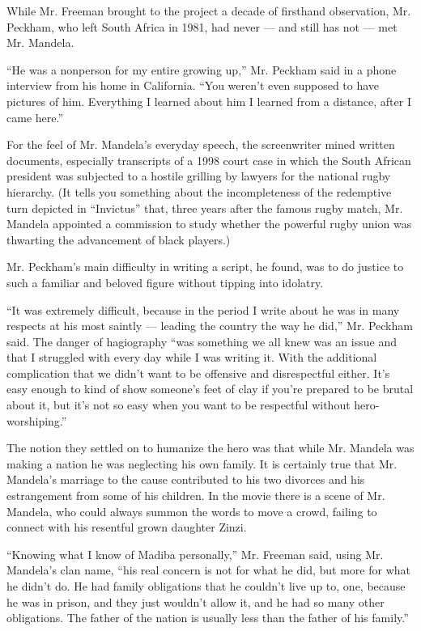 While Mr. Freeman brought to the project a decade of firsthand
observation, Mr. Peckham, who left South Africa in 1981, had never ---
and still has not --- met Mr. Mandela.

``He was a nonperson for my entire growing up,'' Mr. Peckham said in a
phone interview from his home in California. ``You weren't even supposed
to have pictures of him. Everything I learned about him I learned from a
distance, after I came here.''

For the feel of Mr. Mandela's everyday speech, the screenwriter mined
written documents, especially transcripts of a 1998 court case in which
the South African president was subjected to a hostile grilling by
lawyers for the national rugby hierarchy. (It tells you something about
the incompleteness of the redemptive turn depicted in ``Invictus'' that,
three years after the famous rugby match, Mr. Mandela appointed a
commission to study whether the powerful rugby union was thwarting the
advancement of black players.)

Mr. Peckham's main difficulty in writing a script, he found, was to do
justice to such a familiar and beloved figure without tipping into
idolatry.

``It was extremely difficult, because in the period I write about he was
in many respects at his most saintly --- leading the country the way he
did,'' Mr. Peckham said. The danger of hagiography ``was something we
all knew was an issue and that I struggled with every day while I was
writing it. With the additional complication that we didn't want to be
offensive and disrespectful either. It's easy enough to kind of show
someone's feet of clay if you're prepared to be brutal about it, but
it's not so easy when you want to be respectful without
hero-worshiping.''

The notion they settled on to humanize the hero was that while Mr.
Mandela was making a nation he was neglecting his own family. It is
certainly true that Mr. Mandela's marriage to the cause contributed to
his two divorces and his estrangement from some of his children. In the
movie there is a scene of Mr. Mandela, who could always summon the words
to move a crowd, failing to connect with his resentful grown daughter
Zinzi.

``Knowing what I know of Madiba personally,'' Mr. Freeman said, using
Mr. Mandela's clan name, ``his real concern is not for what he did, but
more for what he didn't do. He had family obligations that he couldn't
live up to, one, because he was in prison, and they just wouldn't allow
it, and he had so many other obligations. The father of the nation is
usually less than the father of his family.''


